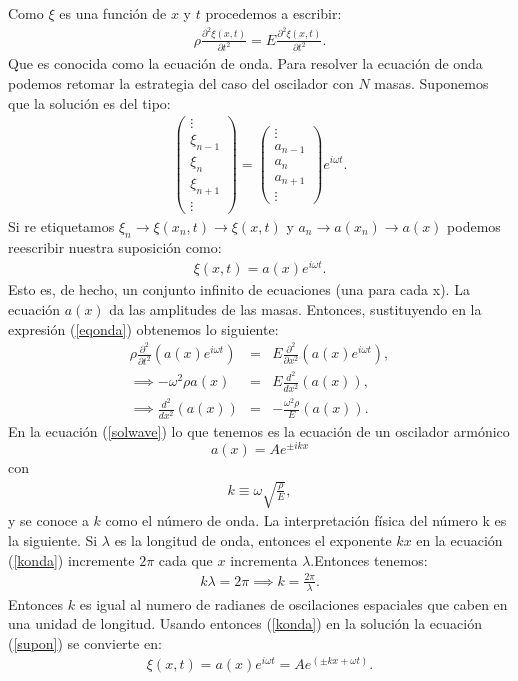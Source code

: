 \documentclass[letterpaper,12pt,oneside]{book}
\begin{document}
%
Como $\xi$ es una funci\'on de $x$ y $t$ procedemos a escribir:
%
\begin{eqnarray}
\rho \frac{\partial^2 \xi(x,t)}{\partial t^2}=E\frac{\partial^2 \xi(x,t)}{\partial t^2}.\label{eqonda}
\end{eqnarray}
%
Que es conocida como la ecuaci\'on de onda. Para resolver la ecuaci\'on de onda podemos retomar la estrategia del caso del oscilador con $N$ masas. Suponemos que la soluci\'on es del tipo:
\begin{eqnarray}
\begin{pmatrix}
\vdots\\
\xi_{n-1}\\
\xi_n\\
\xi_{n+1}\\ 
\vdots
\end{pmatrix}=\begin{pmatrix}
\vdots\\
a_{n-1}\\
a_n\\
a_{n+1}\\
\vdots
\end{pmatrix}e^{i\omega t}.
\end{eqnarray}
%
Si re etiquetamos $\xi_n \rightarrow \xi(x_n,t) \rightarrow \xi(x,t)$ y $a_n \rightarrow a(x_n) \rightarrow a(x)$ podemos reescribir nuestra suposici\'on como:
%
\begin{eqnarray}
\xi(x,t)=a(x)e^{i\omega t}\label{supon}.
\end{eqnarray}
%
Esto es, de hecho, un conjunto infinito de ecuaciones (una para cada x). La ecuaci\'on $a(x)$ da las amplitudes de las masas. Entonces, sustituyendo en la expresi\'on (\ref{eqonda}) obtenemos lo siguiente: 
%
\begin{eqnarray}
\rho \frac{\partial ^2}{\partial t^2}(a(x)e^{i\omega t})&=&E\frac{\partial^2}{\partial x^2}(a(x)e^{i\omega t}),\\
\implies -\omega^2\rho a(x) &=& E\frac{d^2}{dx^2}(a(x)),\\
\implies \frac{d^2}{dx^2}(a(x)) &=& -\frac{\omega^2\rho}{E}(a(x)).\label{solwave}
\end{eqnarray}
%
En la ecuaci\'on (\ref{solwave}) lo que tenemos es la ecuaci\'on de un oscilador arm\'onico 
$$a(x)=Ae^{\pm ik x}$$ 
con
%
\begin{eqnarray}
k\equiv \omega \sqrt{\frac{\rho}{E}}, \label{konda}
\end{eqnarray}
%
y se conoce a $k$ como el n\'umero de onda. La interpretaci\'on f\'isica del n\'umero k es la siguiente. Si $\lambda$ es la longitud de onda, entonces el exponente $kx$ en la ecuaci\'on (\ref{konda}) incremente $2\pi$ cada que $x$ incrementa $\lambda$.Entonces tenemos:
%
\begin{eqnarray}
k\lambda = 2\pi \implies k=\frac{2\pi}{\lambda}.
\end{eqnarray}
%
Entonces $k$ es igual al numero de radianes de oscilaciones espaciales que caben en una unidad de longitud. Usando entonces (\ref{konda}) en la soluci\'on la ecuaci\'on (\ref{supon}) se convierte en:
%
\begin{eqnarray}
\xi(x,t)=a(x)e^{i\omega t} = Ae^{(\pm kx + \omega t)}.
\end{eqnarray}
%
\end{document}
